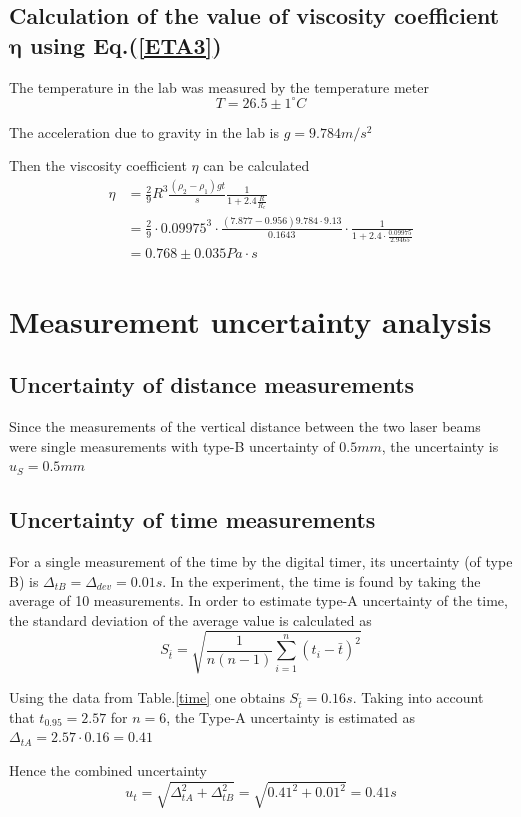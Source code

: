 \documentclass{article}
\begin{document}
\subsection{Calculation of the value of viscosity coefficient $\bm{\eta}$ using Eq.(\ref{ETA3})}

The temperature in the lab was measured by the temperature meter
$$T=26.5\pm1^\circ{}C$$

The acceleration due to gravity in the lab is $g=9.784m/s^2$

Then the viscosity coefficient $\eta$ can be calculated
\begin{align*}
\eta&=\frac{2}{9}R^3\frac{(\rho_2-\rho_1)gt}{s}\frac{1}{1+2.4\frac{R}{R_c}}\\
&=\frac{2}{9}\cdot0.09975^3\cdot\frac{(7.877-0.956)9.784\cdot9.13}{0.1643}\cdot\frac{1}{1+2.4\cdot\frac{0.09975}{2.9465}}\\
&=0.768\pm0.035Pa\cdot s
\end{align*}

\section{Measurement uncertainty analysis}

\subsection{Uncertainty of distance measurements}
Since the measurements of the vertical distance between the two laser beams were single measurements with type-B uncertainty of $0.5mm$, the uncertainty is $u_S=0.5mm$ 

\subsection{Uncertainty of time measurements}
For a single measurement of the time by the digital timer, its uncertainty (of
type B) is $\Delta_{tB}=\Delta_{dev}=0.01s$. In the experiment, the time is found by 
taking the average of 10 measurements. In order to estimate type-A uncertainty of the time, the standard deviation of the average value is calculated as
$$S_{\bar{t}}=\sqrt{\frac{1}{n(n-1)}\sum_{i=1}^n(t_i-\bar{t})^2}$$

Using the data from Table.\ref{time} one obtains $S_{\bar{t}}=0.16s$. Taking into account that $t_{0.95}=2.57$ for $n=6$, the Type-A uncertainty is estimated as $\Delta_{tA}=2.57\cdot0.16=0.41$

Hence the combined uncertainty
$$u_{t}=\sqrt{\Delta^2_{tA}+\Delta^2_{tB}}=\sqrt{0.41^2+0.01^2}=0.41s$$
\end{document}
